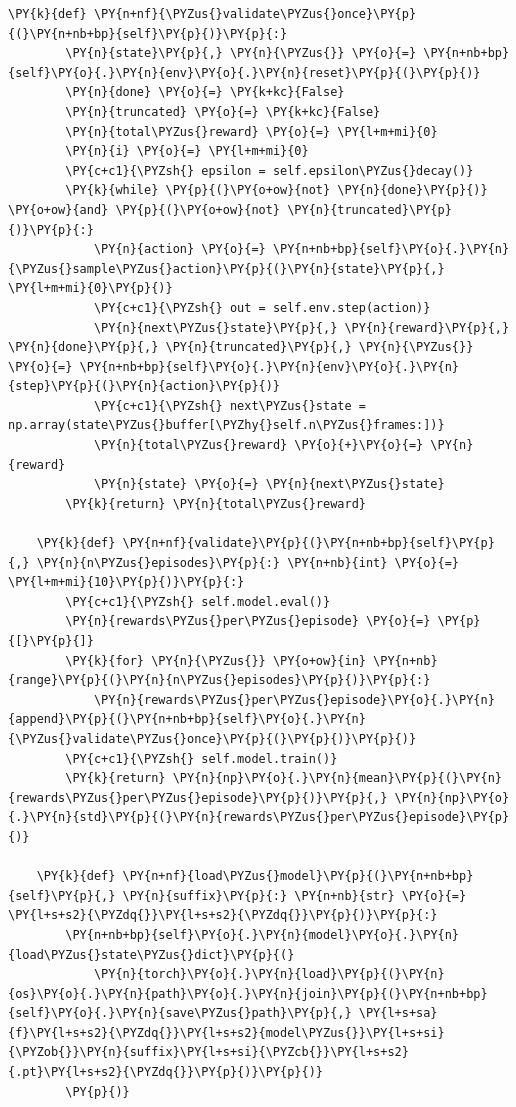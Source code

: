 \documentclass{article}
\begin{document}
\begin{Verbatim}[commandchars=\\\{\}]
    \PY{k}{def} \PY{n+nf}{\PYZus{}validate\PYZus{}once}\PY{p}{(}\PY{n+nb+bp}{self}\PY{p}{)}\PY{p}{:}
        \PY{n}{state}\PY{p}{,} \PY{n}{\PYZus{}} \PY{o}{=} \PY{n+nb+bp}{self}\PY{o}{.}\PY{n}{env}\PY{o}{.}\PY{n}{reset}\PY{p}{(}\PY{p}{)}
        \PY{n}{done} \PY{o}{=} \PY{k+kc}{False}
        \PY{n}{truncated} \PY{o}{=} \PY{k+kc}{False}
        \PY{n}{total\PYZus{}reward} \PY{o}{=} \PY{l+m+mi}{0}
        \PY{n}{i} \PY{o}{=} \PY{l+m+mi}{0}
        \PY{c+c1}{\PYZsh{} epsilon = self.epsilon\PYZus{}decay()}
        \PY{k}{while} \PY{p}{(}\PY{o+ow}{not} \PY{n}{done}\PY{p}{)} \PY{o+ow}{and} \PY{p}{(}\PY{o+ow}{not} \PY{n}{truncated}\PY{p}{)}\PY{p}{:}
            \PY{n}{action} \PY{o}{=} \PY{n+nb+bp}{self}\PY{o}{.}\PY{n}{\PYZus{}sample\PYZus{}action}\PY{p}{(}\PY{n}{state}\PY{p}{,} \PY{l+m+mi}{0}\PY{p}{)}
            \PY{c+c1}{\PYZsh{} out = self.env.step(action)}
            \PY{n}{next\PYZus{}state}\PY{p}{,} \PY{n}{reward}\PY{p}{,} \PY{n}{done}\PY{p}{,} \PY{n}{truncated}\PY{p}{,} \PY{n}{\PYZus{}} \PY{o}{=} \PY{n+nb+bp}{self}\PY{o}{.}\PY{n}{env}\PY{o}{.}\PY{n}{step}\PY{p}{(}\PY{n}{action}\PY{p}{)}
            \PY{c+c1}{\PYZsh{} next\PYZus{}state = np.array(state\PYZus{}buffer[\PYZhy{}self.n\PYZus{}frames:])}
            \PY{n}{total\PYZus{}reward} \PY{o}{+}\PY{o}{=} \PY{n}{reward}
            \PY{n}{state} \PY{o}{=} \PY{n}{next\PYZus{}state}
        \PY{k}{return} \PY{n}{total\PYZus{}reward}

    \PY{k}{def} \PY{n+nf}{validate}\PY{p}{(}\PY{n+nb+bp}{self}\PY{p}{,} \PY{n}{n\PYZus{}episodes}\PY{p}{:} \PY{n+nb}{int} \PY{o}{=} \PY{l+m+mi}{10}\PY{p}{)}\PY{p}{:}
        \PY{c+c1}{\PYZsh{} self.model.eval()}
        \PY{n}{rewards\PYZus{}per\PYZus{}episode} \PY{o}{=} \PY{p}{[}\PY{p}{]}
        \PY{k}{for} \PY{n}{\PYZus{}} \PY{o+ow}{in} \PY{n+nb}{range}\PY{p}{(}\PY{n}{n\PYZus{}episodes}\PY{p}{)}\PY{p}{:}
            \PY{n}{rewards\PYZus{}per\PYZus{}episode}\PY{o}{.}\PY{n}{append}\PY{p}{(}\PY{n+nb+bp}{self}\PY{o}{.}\PY{n}{\PYZus{}validate\PYZus{}once}\PY{p}{(}\PY{p}{)}\PY{p}{)}
        \PY{c+c1}{\PYZsh{} self.model.train()}
        \PY{k}{return} \PY{n}{np}\PY{o}{.}\PY{n}{mean}\PY{p}{(}\PY{n}{rewards\PYZus{}per\PYZus{}episode}\PY{p}{)}\PY{p}{,} \PY{n}{np}\PY{o}{.}\PY{n}{std}\PY{p}{(}\PY{n}{rewards\PYZus{}per\PYZus{}episode}\PY{p}{)}

    \PY{k}{def} \PY{n+nf}{load\PYZus{}model}\PY{p}{(}\PY{n+nb+bp}{self}\PY{p}{,} \PY{n}{suffix}\PY{p}{:} \PY{n+nb}{str} \PY{o}{=} \PY{l+s+s2}{\PYZdq{}}\PY{l+s+s2}{\PYZdq{}}\PY{p}{)}\PY{p}{:}
        \PY{n+nb+bp}{self}\PY{o}{.}\PY{n}{model}\PY{o}{.}\PY{n}{load\PYZus{}state\PYZus{}dict}\PY{p}{(}
            \PY{n}{torch}\PY{o}{.}\PY{n}{load}\PY{p}{(}\PY{n}{os}\PY{o}{.}\PY{n}{path}\PY{o}{.}\PY{n}{join}\PY{p}{(}\PY{n+nb+bp}{self}\PY{o}{.}\PY{n}{save\PYZus{}path}\PY{p}{,} \PY{l+s+sa}{f}\PY{l+s+s2}{\PYZdq{}}\PY{l+s+s2}{model\PYZus{}}\PY{l+s+si}{\PYZob{}}\PY{n}{suffix}\PY{l+s+si}{\PYZcb{}}\PY{l+s+s2}{.pt}\PY{l+s+s2}{\PYZdq{}}\PY{p}{)}\PY{p}{)}
        \PY{p}{)}


\end{Verbatim}
\end{document}
